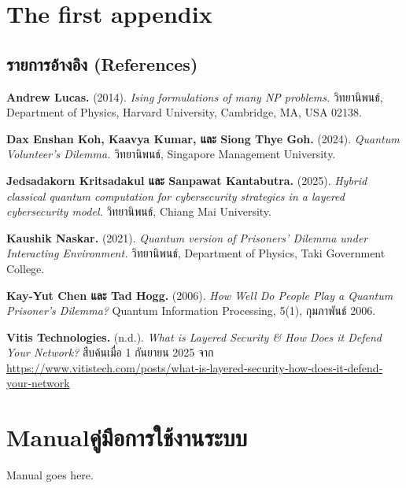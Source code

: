 \chapter{The first appendix}


\section{รายการอ้างอิง (References)}

\textbf{Andrew Lucas.} (2014). \textit{Ising formulations of many NP problems.} วิทยานิพนธ์, Department of Physics, Harvard University, Cambridge, MA, USA 02138.

\textbf{Dax Enshan Koh, Kaavya Kumar, และ Siong Thye Goh.} (2024). \textit{Quantum Volunteer’s Dilemma.} วิทยานิพนธ์, Singapore Management University.

\textbf{Jedsadakorn Kritsadakul และ Sanpawat Kantabutra.} (2025). \textit{Hybrid classical quantum computation for cybersecurity strategies in a layered cybersecurity model.} วิทยานิพนธ์, Chiang Mai University.

\textbf{Kaushik Naskar.} (2021). \textit{Quantum version of Prisoners' Dilemma under Interacting Environment.} วิทยานิพนธ์, Department of Physics, Taki Government College.

\textbf{Kay-Yut Chen และ Tad Hogg.} (2006). \textit{How Well Do People Play a Quantum Prisoner’s Dilemma?} Quantum Information Processing, 5(1), กุมภาพันธ์ 2006.

\textbf{Vitis Technologies.} (n.d.). \textit{What is Layered Security \& How Does it Defend Your Network?} สืบค้นเมื่อ 1 กันยายน 2025 จาก  
\url{https://www.vitistech.com/posts/what‐is‐layered‐security‐how‐does‐it‐defend‐your‐network}

\chapter{\ifenglish Manual\else คู่มือการใช้งานระบบ\fi}

Manual goes here.
